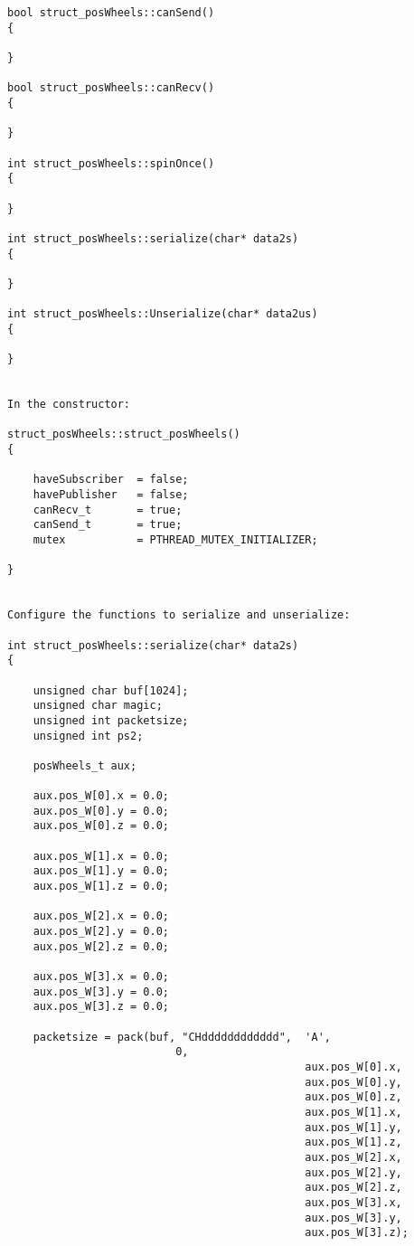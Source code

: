 \begin{verbatim}
bool struct_posWheels::canSend()
{

}

bool struct_posWheels::canRecv()
{

}

int struct_posWheels::spinOnce()
{

}

int struct_posWheels::serialize(char* data2s)
{

}

int struct_posWheels::Unserialize(char* data2us)
{

}


In the constructor:

struct_posWheels::struct_posWheels()
{

    haveSubscriber  = false;
    havePublisher   = false;
    canRecv_t       = true;
    canSend_t       = true;
    mutex           = PTHREAD_MUTEX_INITIALIZER;

}


Configure the functions to serialize and unserialize:

int struct_posWheels::serialize(char* data2s)
{
   
    unsigned char buf[1024];
    unsigned char magic;
    unsigned int packetsize;
    unsigned int ps2;

    posWheels_t aux;

    aux.pos_W[0].x = 0.0;
    aux.pos_W[0].y = 0.0;
    aux.pos_W[0].z = 0.0;

    aux.pos_W[1].x = 0.0;
    aux.pos_W[1].y = 0.0;
    aux.pos_W[1].z = 0.0;

    aux.pos_W[2].x = 0.0;
    aux.pos_W[2].y = 0.0;
    aux.pos_W[2].z = 0.0;

    aux.pos_W[3].x = 0.0;
    aux.pos_W[3].y = 0.0;
    aux.pos_W[3].z = 0.0;

    packetsize = pack(buf, "CHdddddddddddd",  'A',
					      0,
                                              aux.pos_W[0].x,
                                              aux.pos_W[0].y,
                                              aux.pos_W[0].z,
                                              aux.pos_W[1].x,
                                              aux.pos_W[1].y,
                                              aux.pos_W[1].z,
                                              aux.pos_W[2].x,
                                              aux.pos_W[2].y,
                                              aux.pos_W[2].z,
                                              aux.pos_W[3].x,
                                              aux.pos_W[3].y,
                                              aux.pos_W[3].z);


\end{verbatim}
